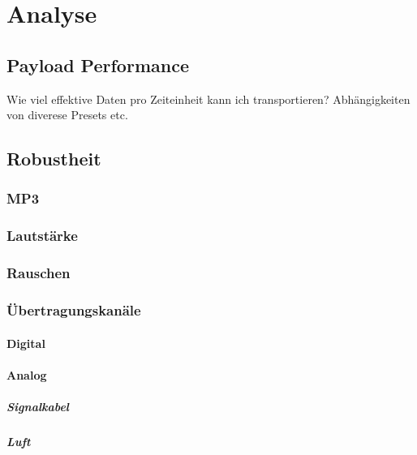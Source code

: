 \chapter{Analyse}
\label{ch:analyse}

\section{Payload Performance}
\label{sec:payloadperformance}

Wie viel effektive Daten pro Zeiteinheit kann ich transportieren? Abhängigkeiten von diverese Presets etc.

\section{Robustheit}

\subsection{MP3}

\subsection{Lautstärke}

\subsection{Rauschen}

\subsection{Übertragungskanäle}

\subsubsection{Digital}

\subsubsection{Analog}

\paragraph{Signalkabel}

\paragraph{Luft}






